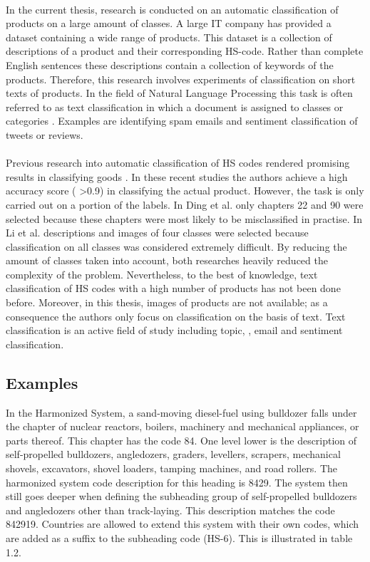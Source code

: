 \\
In the current thesis, research is conducted on an automatic classification of products on a large amount of classes. A large IT company has provided a dataset containing a wide range of products. This dataset is a collection of descriptions of a product and their corresponding HS-code. Rather than complete English sentences these descriptions contain a collection of keywords of the products. Therefore, this research involves experiments of classification on short texts of products. In the field of Natural Language Processing this task is often referred to as text classification in which a document is assigned to classes or categories \cite{Manning2008}. Examples are identifying spam emails and sentiment classification of tweets or reviews.\\
\\
Previous research into automatic classification of HS codes rendered promising results in classifying goods \cite{Ding2015} \cite{Li2019}. In these recent studies the authors achieve a high accuracy score ( \textgreater 0.9) in classifying the actual product. However, the task is only carried out on a portion of the labels. In Ding et al. \cite{Ding2015} only chapters 22 and 90 were selected because these chapters were most likely to be misclassified in practise. In Li et al. \cite{Li2019} descriptions and images of four classes were selected because classification on all classes was considered extremely difficult. By reducing the amount of classes taken into account, both researches heavily reduced the complexity of the problem. Nevertheless, to the best of knowledge, text classification of HS codes with a high number of products has not been done before. Moreover, in this thesis, images of products are not available; as a consequence the authors only focus on classification on the basis of text. Text classification is an active field of study including topic, \cite{Liu2016}, email \cite{7921698} and sentiment \cite{doi:10.1146/annurev-linguistics-011415-040518} classification. 

\subsection{Examples}
In the Harmonized System, a sand-moving diesel-fuel using bulldozer falls under the chapter of nuclear reactors, boilers, machinery and mechanical appliances, or parts thereof. This chapter has the code 84. One level lower is the description of self-propelled bulldozers, angledozers, graders, levellers, scrapers, mechanical shovels, excavators, shovel loaders, tamping machines, and road rollers. The harmonized system code description for this heading is 8429. The system then still goes deeper when defining the subheading group of self-propelled bulldozers and angledozers other than track-laying. This description matches the code 842919. Countries are allowed to extend this system with their own codes, which are added as a suffix to the subheading code (HS-6). This is illustrated in table 1.2.


